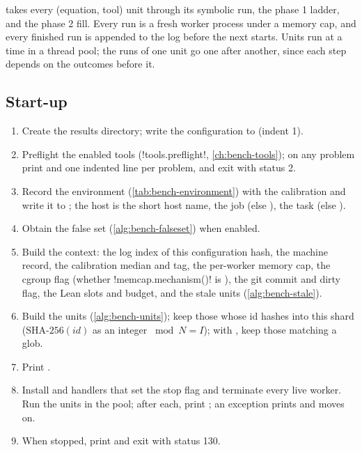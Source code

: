  takes every (equation, tool) unit through its symbolic run, the
phase 1 ladder, and the phase 2 fill. Every run is a fresh worker process under a memory cap,
and every finished run is appended to the log before the next starts. Units run
 at a time in a thread pool; the runs of one unit go one after another,
since each step depends on the outcomes before it.

\subsection{Start-up}

\begin{algorithm}\label{alg:bench-run}
\begin{enumerate}
\item Create the results directory; write the configuration to
   (indent 1).
\item Preflight the enabled tools (\py!tools.preflight!, \cref{ch:bench-tools}); on any problem
  print  and one indented line per problem, and
  exit with status 2.
\item Record the environment (\cref{tab:bench-environment}) with the calibration and write it to
  ; the host is the short host name, the
  job  (else ), the task  (else
  ).
\item Obtain the false set (\cref{alg:bench-falseset}) when enabled.
\item Build the context: the log index of this configuration hash, the machine record, the
  calibration median and tag, the per-worker memory cap, the cgroup flag (whether
  \py!memcap.mechanism()! is ), the git
  commit and dirty flag, the Lean slots and budget, and the stale units
  (\cref{alg:bench-stale}).
\item Build the units (\cref{alg:bench-units}); keep those whose id hashes into this shard
  ($\text{SHA-256}(\mathit{id})$ as an integer $\bmod N = I$); with , keep those
  matching a glob.
\item Print .
\item Install  and  handlers that set the stop flag and terminate
  every live worker. Run the units in the pool; after each, print ; an exception
  prints  and moves on.
\item When stopped, print  and exit with status 130.
\end{enumerate}
\end{algorithm}

